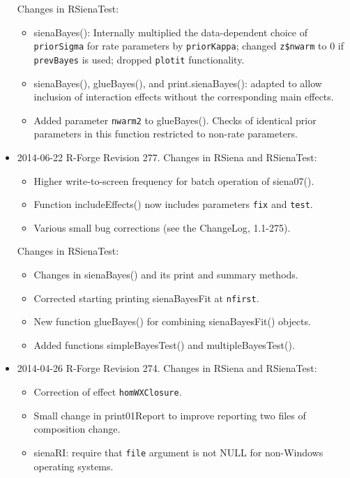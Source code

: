 \documentclass[a4paper,fleqn,11pt]{article}
\newcommand{\+}{\, + \,}
\newcommand{\sfn}[1]{\textsf{#1}}
\begin{document}
\begin{small}
\begin{itemize}
Changes in RSienaTest:
\begin{itemize}
\item  \sfn{sienaBayes()}:
    Internally multiplied the data-dependent choice of
     \texttt{priorSigma} for rate parameters by \texttt{priorKappa};
     changed \texttt{z\$nwarm} to 0 if \texttt{prevBayes} is used;
     dropped \texttt{plotit} functionality.
\item  \sfn{sienaBayes()}, \sfn{glueBayes()}, and
     \sfn{print.sienaBayes()}:
      adapted to allow inclusion of interaction effects without the corresponding
     main effects.
\item Added parameter \texttt{nwarm2} to \sfn{glueBayes()}.
      Checks of identical prior parameters in this function
      restricted to non-rate parameters.
\end{itemize}


\item 2014-06-22 R-Forge Revision 277.
Changes in RSiena and RSienaTest:
\begin{itemize}
\item Higher write-to-screen frequency for batch operation of \sfn{siena07()}.
\item Function \sfn{includeEffects()} now includes parameters \texttt{fix} and \texttt{test}.
\item Various small bug corrections (see the \sfn{ChangeLog}, 1.1-275).
\end{itemize}

Changes in RSienaTest:
\begin{itemize}
\item Changes in \sfn{sienaBayes()} and its print and summary methods.
\item Corrected starting printing \sfn{sienaBayesFit} at \texttt{nfirst}.
\item New function \sfn{glueBayes()} for combining \sfn{sienaBayesFit()} objects.
\item Added functions \sfn{simpleBayesTest()} and \sfn{multipleBayesTest()}.
\end{itemize}

\item 2014-04-26 R-Forge Revision 274.
Changes in RSiena and RSienaTest:
\begin{itemize}
\item Correction of effect \texttt{homWXClosure}.
\item Small change in \sfn{print01Report} to improve reporting
     two files of composition change.
\item \sfn{sienaRI}: require that \texttt{file} argument is not NULL for non-Windows
     operating systems.
\end{itemize}


\end{itemize}
\end{small}
\end{document}
